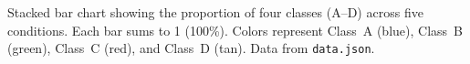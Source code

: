 \caption{Stacked bar chart showing the proportion of four classes (A--D) across five conditions. Each bar sums to 1 (100\%). Colors represent Class~A (\textcolor[HTML]{4C72B0}{blue}), Class~B (\textcolor[HTML]{55A868}{green}), Class~C (\textcolor[HTML]{C44E52}{red}), and Class~D (\textcolor[HTML]{CCB974}{tan}). Data from \texttt{data.json}.}
